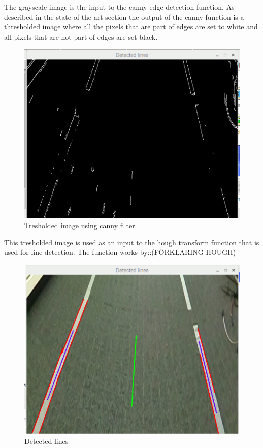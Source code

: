 The grayscale image is the input to the canny edge detection function. As described in the state of the art section the output of the canny function is a thresholded image where all the pixels that are part of edges are set to white and all pixels that are not part of edges are set black.

\begin{figure}[H]
  \includegraphics[scale=0.7]{./img/edges.png}
  \centering
  \caption{Tresholded image using canny filter}
  \label{fig:Tresholded image using canny filter}
\end{figure}

This tresholded image is used as an input to the hough transform function that is used for line detection. The function works by::(FÖRKLARING HOUGH)


\begin{figure}[H]
  \includegraphics[scale=0.7]{./img/detected_lines.png}
  \centering
  \caption{Detected lines}
  \label{fig:Detected lines}
\end{figure}



